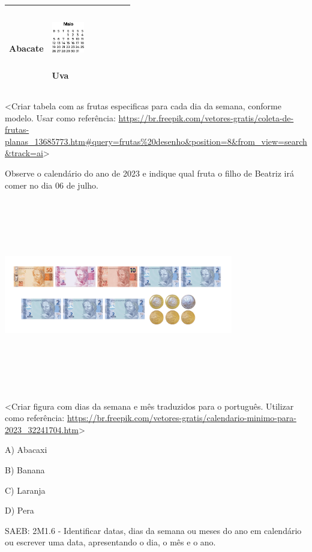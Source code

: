 \begin{longtable}[]{@{}lllllll@{}}
\begin{minipage}[t]{0.14\columnwidth}
Abacate\strut
\end{minipage} & \begin{minipage}[t]{0.14\columnwidth}\raggedright\strut
\includegraphics[width=0.55895in,height=0.73793in]{media/image155.png}

Uva\strut
\end{minipage}\tabularnewline
\bottomrule
\end{longtable}

\textless{}Criar tabela com as frutas especificas para cada dia da
semana, conforme modelo. Usar como referência:
\url{https://br.freepik.com/vetores-gratis/coleta-de-frutas-planas_13685773.htm\#query=frutas\%20desenho\&position=8\&from_view=search\&track=ai}\textgreater{}

Observe o calendário do ano de 2023 e indique qual fruta o filho de
Beatriz irá comer no dia 06 de julho.

\includegraphics[width=3.93750in,height=3.28945in]{media/image156.png}

\textless{}Criar figura com dias da semana e mês traduzidos para o
português. Utilizar como referência:
\url{https://br.freepik.com/vetores-gratis/calendario-minimo-para-2023_32241704.htm}\textgreater{}

A) Abacaxi

B) Banana

C) Laranja

D) Pera

SAEB: 2M1.6 - Identificar datas, dias da semana ou meses do ano em
calendário ou escrever uma data, apresentando o dia, o mês e o ano.

